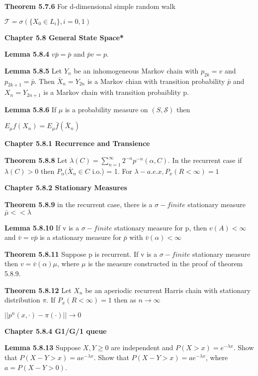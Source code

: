 \documentclass{article}
\begin{document}
\textbf {Theorem 5.7.6} For d-dimensional simple random walk
\begin{center}
$\mathcal{T} = \sigma (\{X_0 \in L_i\}, i = 0,1)$
\end{center}

\textbf {Chapter 5.8 General State Space*}

\textbf {Lemma 5.8.4} $v\bar{p} = \bar{p}$ and $\bar{p}v = p$.

\textbf {Lemma 5.8.5} Let $Y_n$ be an inhomogeneous Markov chain with $p_{2k} = v$ and $p_{2k+1} = \bar{p}$. Then $\bar{X}_n = Y_{2n}$ is a Markov chian with transition probability $\bar{p}$ and $X_n = Y_{2n+1}$ is a Markov chain with transition probaiblity p.

\textbf {Lemma 5.8.6} If $\mu$ is a probability measure on $(S, \mathcal{S})$ then
\begin{center}
$E_\mu f(X_n) = E_\mu \bar{f} (\bar{X}_n)$
\end{center}

\textbf {Chapter 5.8.1 Recurrence and Transience}

\textbf {Theorem 5.8.8} Let $\lambda(C) = \sum_{n=1}^\infty 2^{-n} p^{-n} (\alpha, C)$. In the recurrent case if $\lambda(C) > 0$ then $P_\alpha (\bar{X}_n \in C$ i.o.) = 1. For $\lambda -a.e. x, P_x(R < \infty) = 1$

\textbf {Chapter 5.8.2 Stationary Measures}

\textbf {Theorem 5.8.9} in the recurrent case, there is a $\sigma-finite$ stationary measure $\bar{\mu} << \lambda$

\textbf {Lemma 5.8.10} If v is a $\sigma-finite$ stationary measure for p, then $v(A) < \infty$ and $\bar{v} = v\bar{p}$ is a stationary measure for $\bar{p}$ with $\bar{v}(\alpha) < \infty$

\textbf {Theorem 5.8.11} Suppose p is recurrent. If v is a $\sigma-finite$ stationary measure then $v = \bar{v}(\alpha)\mu$, where $\mu$ is the measure constructed in the proof of theorem 5.8.9.

\textbf {Theorem 5.8.12} Let $X_n$ be an aperiodic recurrent Harris chain with stationary distribution $\pi$. If $P_x(R < \infty) = 1$ then as $n \to \infty$
\begin{center}
$||p^n(x, \cdot) - \pi(\cdot)|| \to 0$
\end{center}

\textbf {Chapter 5.8.4 G1/G/1 queue}

\textbf {Lemma 5.8.13} Suppose $X, Y \geq 0$ are independent and $P(X > x) = e^{-\lambda x}$. Show that $P(X- Y > x) = ae^{-\lambda x}$. Show that $P(X-Y > x) = ae^{-\lambda x}$, where $a = P(X- Y > 0)$.
\end{document}
